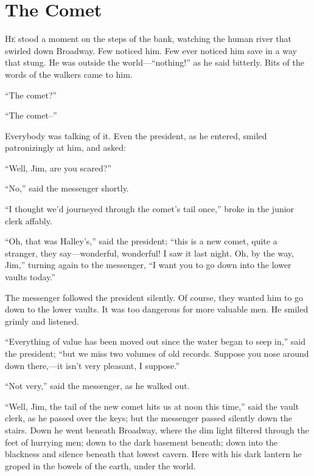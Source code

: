 \chapter{The Comet}

\lettrine[lines=2]{H}{e} stood a moment on the steps of the bank, watching the human
river that swirled down Broadway. Few noticed him. Few ever
noticed him save in a way that stung. He was outside the
world---``nothing!'' as he said bitterly. Bits of the words of the
walkers came to him.

``The comet?''

``The comet--''

Everybody was talking of it. Even the president, as he entered,
smiled patronizingly at him, and asked:

``Well, Jim, are you scared?''

``No,'' said the messenger shortly.

``I thought we'd journeyed through the comet's tail once,'' broke
in the junior clerk affably.

``Oh, that was Halley's,'' said the president; ``this is a new
comet, quite a stranger, they say---wonderful, wonderful! I saw it
last night. Oh, by the way, Jim,'' turning again to the
messenger, ``I want you to go down into the lower vaults today.''

The messenger followed the president silently. Of course, they
wanted him to go down to the lower vaults. It was too dangerous
for more valuable men. He smiled grimly and listened.

``Everything of value has been moved out since the water began to
seep in,'' said the president; ``but we miss two volumes of old
records. Suppose you nose around down there,---it isn't very
pleasant, I suppose.''

``Not very,'' said the messenger, as he walked out.

``Well, Jim, the tail of the new comet hits us at noon this
time,'' said the vault clerk, as he passed over the keys; but the
messenger passed silently down the stairs. Down he went beneath
Broadway, where the dim light filtered through the feet of
hurrying men; down to the dark basement beneath; down into the
blackness and silence beneath that lowest cavern. Here with his
dark lantern he groped in the bowels of the earth, under the
world.


